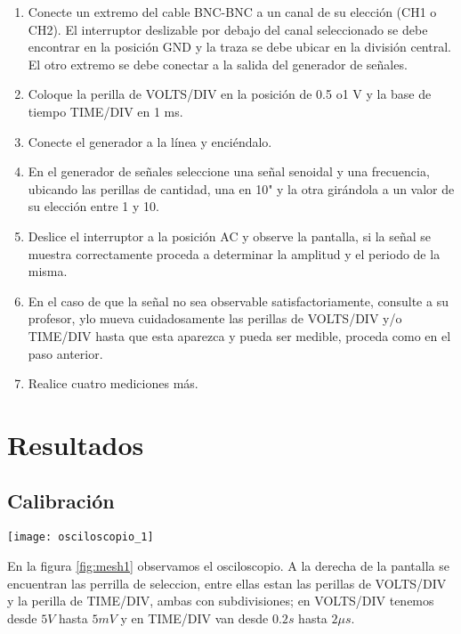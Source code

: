 \documentclass[11pt]{article}
\newenvironment{Figuras}
  {\par\medskip\noindent\minipage{\linewidth}}
  {\endminipage\par\medskip}
\begin{document}
\begin{multicols}{2}
		\begin{enumerate}
			\item Conecte un extremo del cable BNC-BNC a un canal de su elección (CH1 o CH2). El interruptor deslizable por debajo del canal seleccionado se debe encontrar en la posición GND y la traza se debe ubicar en la división central. El otro extremo se debe conectar a la salida del generador de señales.
			\item Coloque la perilla de VOLTS/DIV en la posición de 0.5 o1 V y la base de tiempo TIME/DIV en 1 ms.
			\item Conecte el generador a la línea y enciéndalo.
			\item En el generador de señales seleccione una señal senoidal y una frecuencia, ubicando las perillas de cantidad, una en 10" y la otra girándola a un valor de su elección entre 1 y 10.
			\item Deslice el interruptor a la posición AC y observe la pantalla, si la señal se muestra correctamente proceda a determinar la amplitud y el periodo de la misma.
			\item En el caso de que la señal no sea observable satisfactoriamente, consulte a su profesor, ylo mueva cuidadosamente las perillas de VOLTS/DIV y/o TIME/DIV hasta que esta aparezca y pueda ser medible, proceda como en el paso anterior.
			\item Realice cuatro mediciones más.
		\end{enumerate}


\section{Resultados}

		\subsection{Calibración}

			\begin{Figuras}
				\centering
			    \texttt{[image: osciloscopio\_1]}
			    \label{fig:mesh1}
			\end{Figuras}

			En la figura \ref{fig:mesh1} observamos el osciloscopio. A la derecha de la pantalla se encuentran las perrilla de seleccion, entre ellas estan  las perillas de VOLTS/DIV y la perilla de TIME/DIV, ambas con subdivisiones; en VOLTS/DIV tenemos desde $5V$ hasta $5mV$ y en TIME/DIV van desde $0.2s$ hasta $2\mu s$.


\end{multicols}
\end{document}
